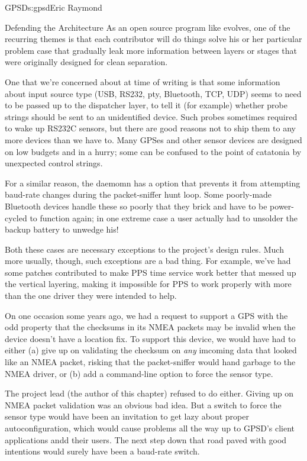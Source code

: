 \begin{aosachapter}{GPSD}{s:gpsd}{Eric Raymond}
\begin{aosasect1}{Defending the Architecture}
As an open source program like  evolves, one of the
recurring themes is that each contributor will do things solve his or
her particular problem case that gradually leak more information
between layers or stages that were originally designed for clean
separation.


One that we're concerned about at time of writing is that some
information about input source type (USB, RS232, pty, Bluetooth, TCP,
UDP) seems to need to be passed up to the dispatcher layer, to tell it
(for example) whether probe strings should be sent to an unidentified
device. Such probes sometimes required to wake up RS232C sensors, but
there are good reasons not to ship them to any more devices than we
have to. Many GPSes and other sensor devices are designed on low
budgets and in a hurry; some can be confused to the point of catatonia
by unexpected control strings.

For a similar reason, the daemomn has a  option that prevents 
it from attempting baud-rate changes  during the packet-sniffer
hunt loop.  Some poorly-made Bluetooth devices handle these so poorly
that they brick and have to be power-cycled to function again; in one
extreme case a user actually had to unsolder the backup battery to
unwedge his!

Both these cases are necessary exceptions to the project's design
rules.  Much more usually, though, such exceptions are a bad thing.
For example, we've had some patches contributed to make PPS time
service work better that messed up the vertical layering, making it
impossible for PPS to work properly with more than the one driver they
were intended to help.


On one occasion some years ago, we had a request to support a GPS with
the odd property that the checksums in its NMEA packets may be invalid
when the device doesn't have a location fix.  To support this device,
we would have had to either (a) give up on validating the checksum on
\emph{any} imcoming data that looked like an NMEA packet, risking that
the packet-sniffer would hand garbage to the NMEA driver, or (b) add a
command-line option to force the sensor type.

The project lead (the author of this chapter) refused to do either.
Giving up on NMEA packet validation was an obvious bad idea.  But a
switch to force the sensor type would have been an invitation to get
lazy about proper autoconfiguration, which would cause problems all
the way up to GPSD's client applications andd their users.  The next
step down that road paved with good intentions would surely have been
a baud-rate switch.


\end{aosasect1}
\end{aosachapter}
